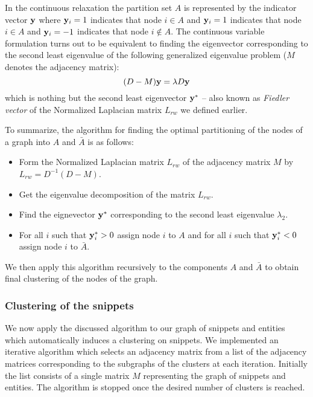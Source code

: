 \documentclass[a4paper,12pt]{report}
\begin{document}
In the continuous relaxation the partition set $A$ is represented by
the indicator vector ${\bf y}$ where ${\bf y}_i = 1$ indicates that
node $i \in A$ and ${\bf y}_i = 1$ indicates that node $i \in A$ and
${\bf y}_i = -1$ indicates that node $i \notin A$. The continuous
variable formulation turns out to be equivalent to finding the
eigenvector corresponding to the second least eigenvalue of the
following generalized eigenvalue problem \cite{shimalik} ($M$ denotes
the adjacency matrix):
$$
(D-M){\bf y} = \lambda D{\bf y}
$$
 which is nothing but the second least eigenvector ${\bf y}^*$ -- also known as
     {\it Fiedler vector} of the Normalized Laplacian matrix $L_{rw}$
     we defined earlier.

To summarize, the algorithm for finding the optimal partitioning of
the nodes of a graph into $A$ and $\bar{A}$ is as follows:

\begin{itemize}
  \item Form the Normalized Laplacian matrix $L_{rw}$ of the adjacency
    matrix $M$ by $L_{rw} = D^{-1}(D-M)$.
  \item Get the eigenvalue decomposition of the matrix $L_{rw}$.
  \item Find the eignevector ${\bf y}^*$ corresponding to the second least
    eigenvalue $\lambda_2$.
  \item For all $i$ such that ${\bf y}_i^* > 0$ assign node $i$ to $A$ and for all
    $i$ such that ${\bf y}_i^* < 0$ assign node $i$ to $\bar{A}$.
\end{itemize}

We then apply this algorithm recursively to the components $A$ and
$\bar{A}$ to obtain final clustering of the nodes of the graph.

\subsubsection{Clustering of the snippets}

We now apply the discussed algorithm to our graph of snippets and
entities which automatically induces a clustering on snippets. We
implemented an iterative algorithm which selects an adjacency matrix
from a list of the adjacency matrices corresponding to the subgraphs
of the clusters at each iteration. Initially the list consists of a
single matrix $M$ representing the graph of snippets and entities. The
algorithm is stopped once the desired number of clusters is reached.
\end{document}
